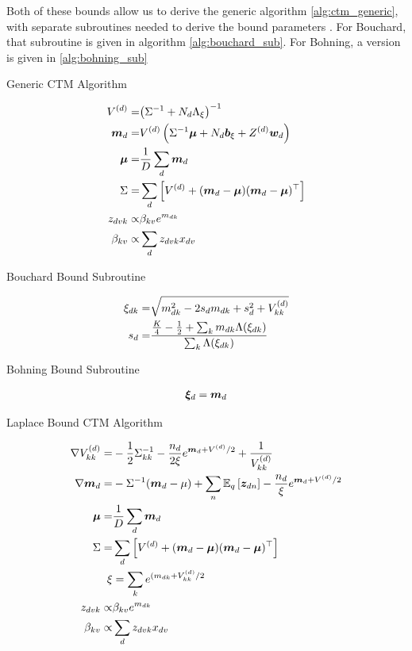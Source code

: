 Both of these bounds allow us to derive the generic algorithm \ref{alg:ctm_generic}, with separate subroutines needed to derive the bound parameters . For Bouchard, that subroutine is given in algorithm \ref{alg:bouchard_sub}. For Bohning, a version is given in \ref{alg:bohning_sub}

\begin{algorithm}
\caption{Generic CTM Algorithm}
\label{alg:ctm_generic}
    \begin{align}
         V^{(d)} = & {\left( { {\Sigma}^{-1} } + N_d { \Lambda_{\xi} } \right)}^{-1}\\
         \bm m_d = & V^{(d)} \left({ {\Sigma}^{-1} } \bm \mu + N_d { \bm b_{\xi} } + Z^{(d)}\bm w_d \right )\\
        \bm \mu    = &\frac{1}{D} \sum_d \bm m_d \\
        \Sigma = & \sum_d \left[ V^{(d)} + (\bm m_d - \bm \mu)(\bm m_d - \bm \mu)^\top \right] \\
        z_{dvk} \propto & \beta_{kv} e^{m_{dk}} \\
        \beta_{kv} \propto & \sum_d z_{dvk} x_{dv} 
    \end{align}
\end{algorithm}

\begin{algorithm}
\caption{Bouchard Bound Subroutine}
\label{alg:bouchard_sub}
    \begin{align}
         {\xi_{dk}} = & \sqrt{m_{dk}^2 - 2s_d m_{dk} + s_d^2 + V^{(d)}_{kk}} \\
        s_d = & \frac{\frac{K}{4} - \frac{1}{2} + \sum_k m_{dk} {\Lambda(\xi_{dk})}}{\sum_k {\Lambda(\xi_{dk})}} \\
    \end{align}
\end{algorithm}

\begin{algorithm}
\caption{Bohning Bound Subroutine}
\label{alg:bohning_sub}
    \begin{align}
         {  \bm \xi _d} = \bm m_d 
    \end{align}
\end{algorithm}



\begin{algorithm}
\caption{Laplace Bound CTM Algorithm}
\label{alg:ctm_laplace}
    \begin{align}
         \nabla V^{(d)}_{kk} = & -\frac{1}{2} {\Sigma}^{-1}_{kk} - \frac{n_d}{2\xi}e^{\bm m_d + V^{(d)}/2} + \frac{1}{ {V^{(d)}_{kk}} }\\
         \nabla \bm m_d = & -{\Sigma}^{-1} (\bm m_d - \mu) + \sum_n \mathbb{E}_{ { q } }\left[ { \bm z_{dn} } \right] - \frac{n_d}{\xi} e^{\bm m_d + V^{(d)}/2}\\
        \bm \mu    = &\frac{1}{D} \sum_d \bm m_d \\
        \Sigma = & \sum_d \left[ V^{(d)} + (\bm m_d - \bm \mu)(\bm m_d - \bm \mu)^\top \right] \\
        \xi & = \sum_k e^{(m_{dk} + V^{(d)}_{kk}/2} \\
        z_{dvk} \propto & \beta_{kv} e^{m_{dk}} \\
        \beta_{kv} \propto & \sum_d z_{dvk} x_{dv} 
    \end{align}
\end{algorithm}



